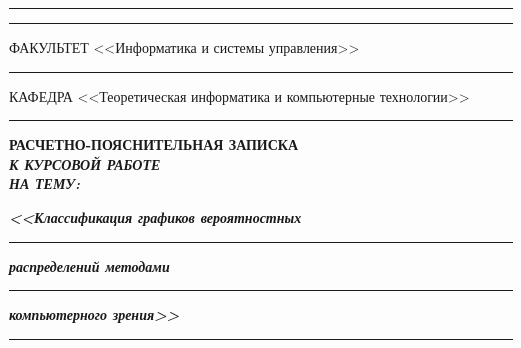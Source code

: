 \documentclass[14pt, russian]{scrartcl}
\begin{document}
\begin{titlepage}
	\vspace{-2pt}
	\hspace{-34.5pt}\rule{\textwidth}{2.5pt}

	\vspace*{-20.3pt}
	\hspace{-34.5pt}\rule{\textwidth}{0.4pt}

	\vspace{0.5ex}
	\noindent \small ФАКУЛЬТЕТ\hspace{80pt} <<Информатика и системы управления>>

	\vspace*{-16pt}
	\hspace{35pt}\rule{0.855\textwidth}{0.4pt}

	\vspace{0.5ex}
	\noindent \small КАФЕДРА\hspace{50pt} <<Теоретическая информатика и компьютерные технологии>>

	\vspace*{-16pt}
	\hspace{25pt}\rule{0.875\textwidth}{0.4pt}


	\vspace{3em}

	\begin{center}
		\Large \bf{РАСЧЕТНО-ПОЯСНИТЕЛЬНАЯ ЗАПИСКА\\\textbf{\textit{К КУРСОВОЙ РАБОТЕ\\НА ТЕМУ:}} \\}
	\end{center}

	\vspace*{-6ex}
        \begin{center}
		\Large{\textit{\textbf{<<Классификация графиков вероятностных}}}

		\vspace*{-3ex}
		\rule{0.9\textwidth}{1.2pt}

		\vspace*{-0.2ex}
		\Large{\textit{\textbf{распределений методами}}}
		\vspace*{-3ex}


		\vspace*{-0.2ex}
		\rule{0.9\textwidth}{1.2pt}

		\Large{\textit{\textbf{компьютерного зрения>>}}}

		\vspace*{-3ex}
		\vspace*{-0.2ex}
		\rule{0.9\textwidth}{1.2pt}


\end{center}
\end{titlepage}
\end{document}
